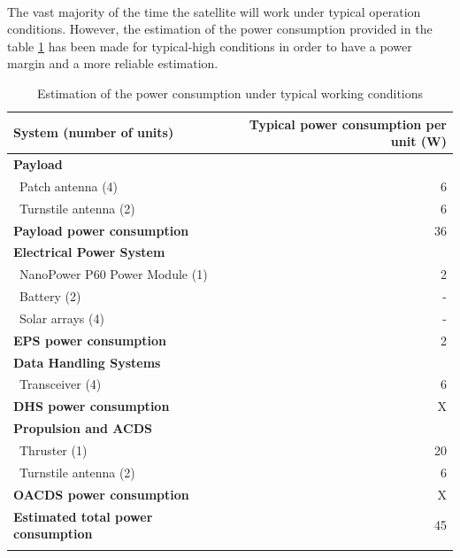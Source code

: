 \paragraph{}The vast majority of the time the satellite will work under typical operation conditions. However, the estimation of the power consumption provided in the table \ref{powerestimation} has been made for typical-high conditions in order to have a power margin and a more reliable estimation.


\begin{longtable}{| l | r | }
\hline
\rowcolor[gray]{0.80}	\textbf{System (number of units)} &  \textbf{Typical power consumption per unit (W)} \\
\hline
\endfirsthead

\rowcolor[gray]{0.85} \textbf{Payload} &  \\
	   ~Patch antenna (4) & 6 \\
	   ~Turnstile antenna (2) & 6 \\
	   \rowcolor[gray]{0.95} \textbf{Payload power consumption} & 36 \\
	   \hline
	\hline

\rowcolor[gray]{0.85} \textbf{Electrical Power System} &  \\
	   ~NanoPower P60 Power Module (1) & 2 \\
	   ~Battery (2) & - \\
	   ~Solar arrays (4) & -\\
	   \rowcolor[gray]{0.95} \textbf{EPS power consumption} & 2 \\
	   \hline
	\hline
	
\rowcolor[gray]{0.85} \textbf{Data Handling Systems} &  \\
	   ~Transceiver (4) & 6 \\
	   \rowcolor[gray]{0.95} \textbf{DHS power consumption} & X \\
	   \hline
	\hline
	
\rowcolor[gray]{0.85} \textbf{Propulsion and ACDS} &  \\
	   ~Thruster (1) & 20 \\
	   ~Turnstile antenna (2) & 6 \\
	   \rowcolor[gray]{0.95} \textbf{OACDS power consumption} & X \\
	   \hline
	\hline

\rowcolor[gray]{0.65} \textbf{Estimated total power consumption} & 45 \\


\caption{Estimation of the power consumption under typical working conditions}
\label{powerestimation}
\end{longtable}

